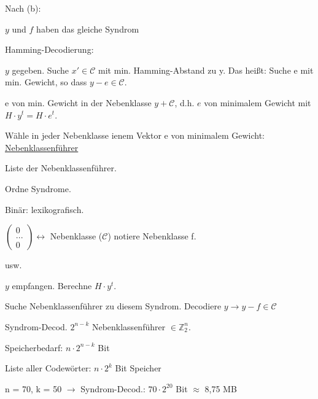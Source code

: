 \documentclass[a4paper, openany]{book}
\begin{document}
Nach (b):

\begin{center}
	$y$ und $f$ haben das gleiche Syndrom
\end{center}

Hamming-Decodierung:

$y$ gegeben. Suche $x' \in \mathcal{C}$ mit min. Hamming-Abstand zu y. Das heißt: Suche e mit min. Gewicht, so dass $y-e \in \mathcal{C}$.

\par \medskip

e von min. Gewicht in der Nebenklasse $y + \mathcal{C}$, d.h. $e$ von minimalem Gewicht mit $H \cdot y^t = H \cdot e^t$.

\par \medskip

Wähle in jeder Nebenklasse ienem Vektor e von minimalem Gewicht: \underline{Nebenklassenführer} 

\par \medskip

Liste der Nebenklassenführer.

Ordne Syndrome.

Binär: lexikografisch.

$\begin{pmatrix}0 \\ ... \\ 0 \end{pmatrix} \leftrightarrow$ Nebenklasse ($\mathcal{C}$) notiere Nebenklasse f.

usw.

\par \medskip

$y$ empfangen. Berechne $H \cdot y^t$.

\par \medskip

Suche Nebenklassenführer zu diesem Syndrom. Decodiere $y \rightarrow y-f \in \mathcal{C}$

\par \medskip

Syndrom-Decod. $2^{n-k}$ Nebenklassenführer $\in \mathbb{Z}_2^n$.

Speicherbedarf: $n \cdot 2^{n-k}$ Bit

\par \medskip

Liste aller Codewörter: $n \cdot 2^k$ Bit Speicher

\par \medskip

n = 70, k = 50 $\rightarrow$ Syndrom-Decod.: $70 \cdot 2^{20}$ Bit $\approx$ 8,75 MB
\end{document}
